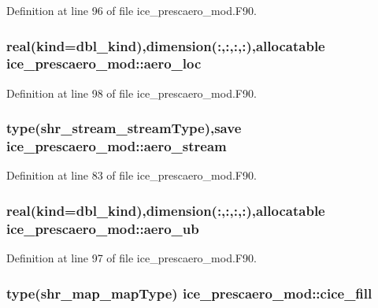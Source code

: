 Definition at line 96 of file ice\_\-prescaero\_\-mod.F90.\hypertarget{namespaceice__prescaero__mod_a0bde5e1bf6589d6060071642738d53be}{
\subsubsection[{aero\_\-loc}]{\setlength{\rightskip}{0pt plus 5cm}real(kind=dbl\_\-kind),dimension(:,:,:,:),allocatable {\bf ice\_\-prescaero\_\-mod::aero\_\-loc}}}
\label{namespaceice__prescaero__mod_a0bde5e1bf6589d6060071642738d53be}


Definition at line 98 of file ice\_\-prescaero\_\-mod.F90.\hypertarget{namespaceice__prescaero__mod_acec6a7f28171dd632bbd24ad76884414}{
\subsubsection[{aero\_\-stream}]{\setlength{\rightskip}{0pt plus 5cm}type(shr\_\-stream\_\-streamType),save {\bf ice\_\-prescaero\_\-mod::aero\_\-stream}}}
\label{namespaceice__prescaero__mod_acec6a7f28171dd632bbd24ad76884414}


Definition at line 83 of file ice\_\-prescaero\_\-mod.F90.\hypertarget{namespaceice__prescaero__mod_a5da19bde8a1695cce4a672195097610a}{
\subsubsection[{aero\_\-ub}]{\setlength{\rightskip}{0pt plus 5cm}real(kind=dbl\_\-kind),dimension(:,:,:,:),allocatable {\bf ice\_\-prescaero\_\-mod::aero\_\-ub}}}
\label{namespaceice__prescaero__mod_a5da19bde8a1695cce4a672195097610a}


Definition at line 97 of file ice\_\-prescaero\_\-mod.F90.\hypertarget{namespaceice__prescaero__mod_a24d44223461a3f3c815c1c8ef882947f}{
\subsubsection[{cice\_\-fill}]{\setlength{\rightskip}{0pt plus 5cm}type(shr\_\-map\_\-mapType) {\bf ice\_\-prescaero\_\-mod::cice\_\-fill}}}
\label{namespaceice__prescaero__mod_a24d44223461a3f3c815c1c8ef882947f}


